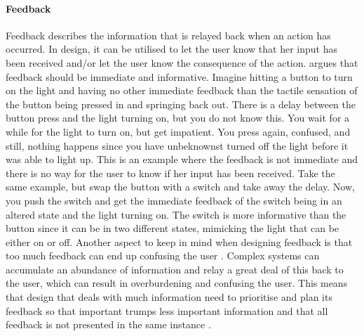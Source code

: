 \paragraph{Feedback} Feedback describes the information that is relayed back when an action has occurred. In design, it can be utilised to let the user know that her input has been received and/or let the user know the consequence of the action.  argues that feedback should be immediate and informative. Imagine hitting a button to turn on the light and having no other immediate feedback than the tactile sensation of the button being pressed in and springing back out. There is a delay between the button press and the light turning on, but you do not know this. You wait for a while for the light to turn on, but get impatient. You press again, confused, and still, nothing happens since you have unbeknownst turned off the light before it was able to light up. This is an example where the feedback is not immediate and there is no way for the user to know if her input has been received. Take the same example, but swap the button with a switch and take away the delay. Now, you push the switch and get the immediate feedback of the switch being in an altered state and the light turning on. The switch is more informative than the button since it can be in two different states, mimicking the light that can be either on or off. Another aspect to keep in mind when designing feedback is that too much feedback can end up confusing the user \cite{norman}. Complex systems can accumulate an abundance of information and relay a great deal of this back to the user, which can result in overburdening and confusing the user. This means that design that deals with much information need to prioritise and plan its feedback so that important trumps less important information and that all feedback is not presented in the same instance \cite{norman}.

